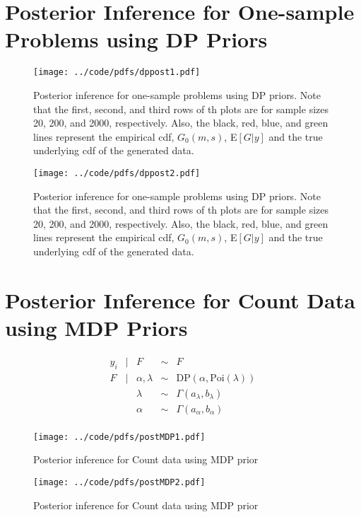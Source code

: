 \documentclass{article}
\def\beginmyfig{\begin{figure}[htbp]\begin{center}}
\def\endmyfig{\end{center}\end{figure}}
\begin{document}
\section{Posterior Inference for One-sample Problems using DP Priors}
\beginmyfig
  \texttt{[image: ../code/pdfs/dppost1.pdf]}
  \caption{Posterior inference for one-sample problems using 
  DP priors. Note that the first, second, and third rows of th plots are for
  sample sizes 20, 200, and 2000, respectively.  Also, the black, red, blue, and
  green lines represent the empirical cdf, $G_0(m,s)$, E$[G|y]$ and the true
  underlying cdf of the generated data.}
\endmyfig
\beginmyfig
  \texttt{[image: ../code/pdfs/dppost2.pdf]}
  \caption{Posterior inference for one-sample problems using 
  DP priors. Note that the first, second, and third rows of th plots are for
  sample sizes 20, 200, and 2000, respectively.  Also, the black, red, blue, and
  green lines represent the empirical cdf, $G_0(m,s)$, E$[G|y]$ and the true
  underlying cdf of the generated data.}
\endmyfig


\newpage
\section{Posterior Inference for Count Data using MDP Priors}
\[
  \begin{array}{rclcl}
    y_i &|& F &\sim & F \\
    F &|& \alpha, \lambda &\sim& \text{DP}(\alpha,\text{Poi}(\lambda)) \\
      && \lambda &\sim& \Gamma(a_\lambda,b_\lambda) \\
      && \alpha &\sim& \Gamma(a_\alpha,b_\alpha) \\
  \end{array}
\]
\beginmyfig
  \texttt{[image: ../code/pdfs/postMDP1.pdf]}
  \caption{Posterior inference for Count data using MDP prior}
\endmyfig
\beginmyfig
  \texttt{[image: ../code/pdfs/postMDP2.pdf]}
  \caption{Posterior inference for Count data using MDP prior}
\endmyfig
\end{document}
